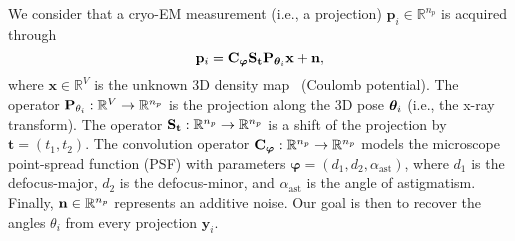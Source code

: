 We consider that a cryo-EM measurement (i.e., a projection) $\mathbf{p}_i \in \mathbb{R}^{n_p}$ is acquired through
\begin{equation*}
    \label{eqn:projection-eqn}
    \mathbf{p}_i = \mathbf{C}_{\boldsymbol\varphi} \mathbf{S}_{\mathbf{t}} \mathbf{P}_{{\boldsymbol{\theta}}_i} \mathbf{x} + \mathbf{n},
\end{equation*}
where $\mathbf x \in \mathbb{R}^{V}$ is the unknown 3D density map~\cite{dimaio_creating_2007} (Coulomb potential).
The operator $\mathbf{P}_{\theta_i}: \mathbb{R}^V \to \mathbb{R}^{n_p}$ is the projection along the 3D pose ${\boldsymbol{\theta}}_i$ (i.e., the x-ray transform).
The operator $\mathbf{S}_\mathbf{t}: \mathbb{R}^{n_p} \to \mathbb{R}^{n_p}$ is a shift of the projection by $\mathbf{t} = (t_1, t_2)$.
The convolution operator $\mathbf{C}_{\boldsymbol\varphi}: \mathbb{R}^{n_p} \to \mathbb{R}^{n_p}$ models the microscope point-spread function (PSF) with parameters $\boldsymbol\varphi = (d_1, d_2, \alpha_\mathrm{ast})$, where $d_1$ is the defocus-major, $d_2$ is the defocus-minor, and $\alpha_\mathrm{ast}$ is the angle of astigmatism.
Finally, $\mathbf{n} \in \mathbb{R}^{n_p}$ represents an additive noise. Our goal is then to recover the angles $\theta_i$ from every projection $\mathbf{y}_i$.
 

